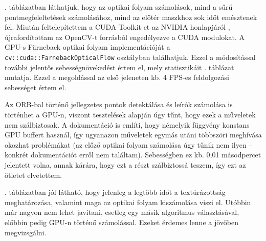. táblázatban láthatjuk, hogy az optikai folyam számolások, mind a sűrű pontmegfeleltetések számolásához, mind az előtér maszkhoz sok időt emésztenek fel. Miután feltelepítettem a CUDA Toolkit-et az NVIDIA honlapjáról \cite{cuda-nvidia}, újrafordítottam az OpenCV-t forrásból engedélyezve a CUDA modulokat. A GPU-s Färneback optikai folyam implementációját a \texttt{cv::cuda::FarnebackOpticalFlow} osztályban találhatjuk. Ezzel a módosítással további jelentős sebességnövekedést értem el, mely statisztikáit . táblázat mutatja. Ezzel a megoldással az első jeleneten kb. 4 FPS-es feldolgozási sebességet értem el.

Az ORB-bal történő jellegzetes pontok detektálása és leírók számolása is történhet a GPU-n, viszont tesztelések alapján úgy tűnt, hogy ezek a műveletek nem szálbiztosak. A dokumentáció\cite{cuda-stream} is említi, hogy némelyik függvény konstans GPU buffert használ, így ugyanazon műveletek egymás utáni többszöri meghívása okozhat problémákat (az előző optikai folyam számolása úgy tűnik nem ilyen -- konkrét dokumentációt erről nem találtam). Sebességben ez kb. 0,01 másodpercet jelentett volna, annak kárára, hogy ezt a részt szálbiztossá teszem, így ezt az ötletet elvetettem.

. táblázatban jól látható, hogy jelenleg a legtöbb időt a textúrázottság meghatározása, valamint maga az optikai folyam kiszámolása viszi el. Utóbbin már nagyon nem lehet javítani, esetleg egy másik algoritmus választásával, előbbin pedig GPU-n történő számolással. Ezeket érdemes lenne a jövőben megvizsgálni.

